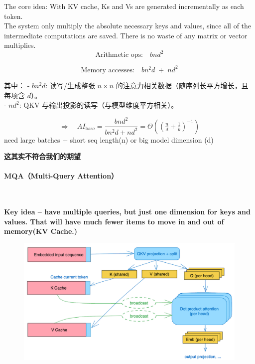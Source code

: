 \clearpage
{}
{{\color{dblue} The core idea: With KV cache, Ks and Vs are generated incrementally as each token.}\\

The system only multiply the absolute necessary keys and values, since all of the intermediate computations are saved. There is no waste of any matrix or vector multiplies.\\

\[
\text{Arithmetic ops:} \quad b n d^{2}
\]

\[
\text{Memory accesses:} \quad b n^{2} d \;+\; n d^{2}
\]


其中：
- $b n^{2} d$: 读写/生成整张 $n \times n$ 的注意力相关数据（随序列长平方增长，且每项含 $d$）。\\
- $n d^{2}$: QKV 与输出投影的读写（与模型维度平方相关）。

\[
\Rightarrow \quad 
AI_{\text{base}}
= \frac{b n d^{2}}{b n^{2} d + n d^{2}}
= \Theta \!\left( \left( \tfrac{n}{d} + \tfrac{1}{b} \right)^{-1} \right)
\]
need large batches + short seq length(n) or big model dimension (d)

\textbf{这其实不符合我们的期望}
}

\paragraph{MQA（Multi-Query Attention）}~{}

\textbf{{\color{tred} Key idea – have multiple queries, but just one dimension for keys and values.
That will have much fewer items to move in and out of memory(KV Cache.)}
}

\begin{figure}[htbp]
  \centering
  \includegraphics[width=1\linewidth]{figs/lec3/lec3.34.png}
\end{figure}

